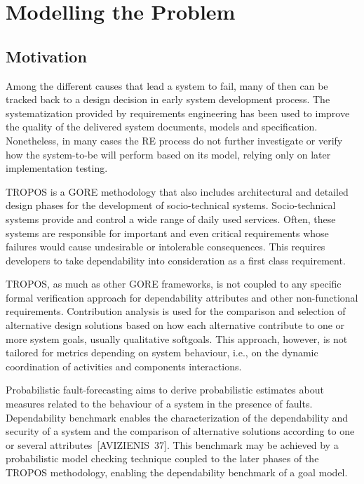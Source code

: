 \chapter{Modelling the Problem}

\section{Motivation}

Among the different causes that lead a system to fail, many of then can be tracked back to a design decision in early system development process. The systematization provided by requirements engineering has been used to improve the quality of the delivered system documents, models and specification. Nonetheless, in many cases the RE process do not further investigate or verify how the system-to-be will perform based on its model, relying only on later implementation testing.

TROPOS is a GORE methodology that also includes architectural and  detailed design phases for the development of socio-technical systems. Socio-technical systems provide and control a wide range of daily used services. Often, these systems are responsible for important and even critical requirements whose failures would cause undesirable or intolerable consequences. This requires developers to take dependability into consideration as a first class requirement.

TROPOS, as much as other GORE frameworks, is not coupled to any specific formal verification approach for dependability attributes and other non-functional requirements. Contribution analysis is used for the comparison and selection of alternative design solutions based on how each alternative contribute to one or more system goals, usually qualitative softgoals. This approach, however, is not tailored for metrics depending on system behaviour, i.e., on the dynamic coordination of activities and components interactions. 

Probabilistic fault-forecasting aims to derive probabilistic estimates about measures related to the behaviour of a system in the presence of faults. Dependability benchmark enables the characterization of the dependability and security of a system and the comparison of alternative solutions according to one or several attributes~[AVIZIENIS~37]. This benchmark may be achieved by a probabilistic model checking technique coupled to the later phases of the TROPOS methodology, enabling the dependability benchmark of a goal model.

